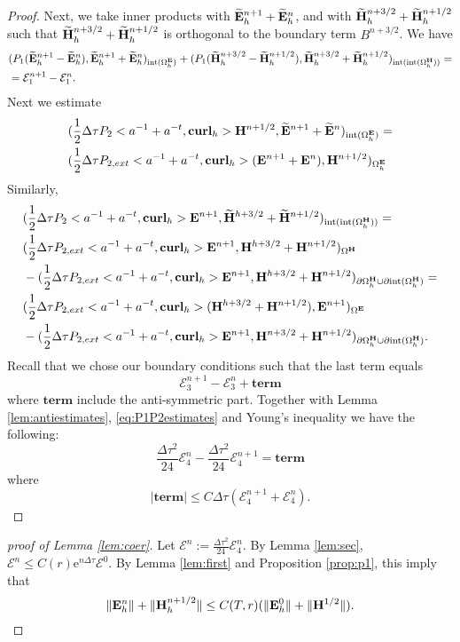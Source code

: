 \documentclass[12pt,reqno]{amsart}
\newcommand{\curl}{{\bf curl}}
\newcommand{\e}{{\bf E}}
\newcommand{\h}{{\bf H}}
\theoremstyle{definition}
\numberwithin{equation}{section}
\newcommand{\intr}[1]{\mathrm{int}(#1)}
\def\Gw{\Omega}     \def\Gx{\Xi}         \def\Gy{\Psi}
\def\Gwh{\Omega_h}
\begin{document}
\begin{proof}
	
	Next, we take inner products  with $\widetilde{\e}_h^{n+1}+\widetilde{\e}_h^n$,
	and with 
	$\widetilde{\h}_h^{n+3/2}+\widetilde{\h}_h^{n+1/2}$ such that 
	$\widetilde{\h}_h^{n+3/2}+\widetilde{\h}_h^{n+1/2}$ is orthogonal to the boundary term $B^{n+3/2}$.
We have
	\begin{align*}
		&
		(P_1(\widetilde{\e}^{n+1}_h-\widetilde{\e}^{n}_h),\widetilde{\e}^{n+1}_h+\widetilde{\e}^{n}_h)_{\intr{\Gwh^\e}}+
		(P_1(\widetilde{\h}^{n+3/2}_h-\widetilde{\h}^{n+1/2}_h),\widetilde{\h}^{n+3/2}_h+\widetilde{\h}^{n+1/2}_h)_{\intr{\intr{\Gwh^\h}}}=\\&
		=\mathcal{E}_1^{n+1}-\mathcal{E}_1^{n}.
	\end{align*}
	Next we estimate
	\begin{align*}
		&
		(\frac{1}{2}\Delta \tau P_2<a^{-1}+a^{-t},\curl_h>\h^{n+1/2},\widetilde{\e}^{n+1}+\widetilde{\e}^{n})_{ \intr{\Gwh^\e}}=\\&
		(\frac{1}{2}\Delta \tau P_{2,ext}<a^{-1}+a^{-t},\curl_h>(\e^{n+1}+\e^{n}),\h^{n+1/2})_{ {\Gwh^\e}}
	\end{align*}
	Similarly,
	\begin{align*}
		&
		(\frac{1}{2}\Delta \tau P_2<a^{-1}+a^{-t},\curl_h>\e^{n+1},\widetilde{\h}^{h+3/2}+\widetilde{\h}^{n+1/2})_{\intr{\intr{\Gwh^\h}}}=\\&
		(\frac{1}{2}\Delta \tau P_{2,ext}<a^{-1}+a^{-t},\curl_h>\e^{n+1},\h^{h+3/2}+\h^{n+1/2})_{{\Gw^\h}}
		\\&
		-(\frac{1}{2}\Delta \tau P_{2,ext}<a^{-1}+a^{-t},\curl_h>\e^{n+1},\h^{h+3/2}+\h^{n+1/2})_{\partial{\Gwh^\h}\cup \partial \intr{\Gwh^\h}}=\\&
		(\frac{1}{2}\Delta \tau P_{2,ext}<a^{-1}+a^{-t},\curl_h>(\h^{h+3/2}+\h^{n+1/2}),\e^{n+1})_{{{\Gw^\e}}}
		\\&
		-(\frac{1}{2}\Delta \tau P_{2,ext}<a^{-1}+a^{-t},\curl_h>\e^{n+1},\h^{n+3/2}+\h^{n+1/2})_{\partial{\Gwh^\h}\cup \partial \intr{\Gwh^\h}}.
	\end{align*}
	Recall that we chose our boundary conditions such that 
	the last term equals $$\mathcal{E}_3^{n+1}-\mathcal{E}_3^{n}+
	\mathbf{term}$$ where $\mathbf{term}$ include the anti-symmetric part.
	Together with Lemma \ref{lem:antiestimates}, \eqref{eq:P1P2estimates} and Young's inequality we have the following:
		$$\frac{\Delta \tau^2}{24}\mathcal{E}_4^n-
\frac{\Delta \tau^2}{24}	\mathcal{E}_4^{n+1}=
	\mathbf{term}
		$$
		where 
		$$
	|	\mathbf{term}|\leq C \Delta \tau( \mathcal{E}_4^{n+1}+\mathcal{E}_4^{n}).
		$$
\end{proof}
\begin{proof}[proof of Lemma \ref{lem:coer}]
Let $\mathcal{E}^n:=\frac{\Delta \tau^2}{24}\mathcal{E}_4^n$.
By Lemma \ref{lem:sec}, $\mathcal{E}^n\leq C(r)\mathrm{e}^{n\Delta \tau}\mathcal{E}^0$.
By Lemma \ref{lem:first} and Proposition \ref{prop:p1}, this imply that 
$$
\|\e_h^n\|+\|\h_h^{n+1/2}\|\leq C(T,r)(\|\e_h^0\|+\|\h^{1/2}\|).
$$
\end{proof}
\end{document}
